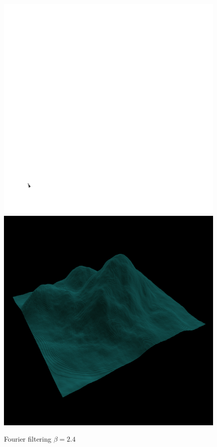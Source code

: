 	\begin{figure}[H]
	  \centering
	  \includegraphics[width=\imagewidth]{images/results/terrains/512-1/fourier/24}
	  \includegraphics[width=\imagewidth]{images/results/terrains/512-1/fourier/24_3d}
	  \caption{Fourier filtering $\beta = 2.4$}
	  \label{fig:ex-fourier24-surface}
	\end{figure}
      
